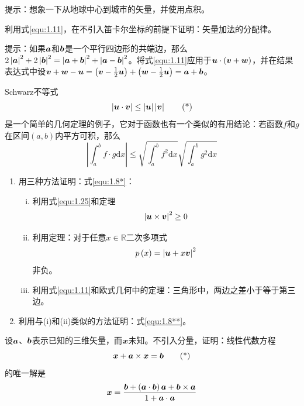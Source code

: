 \begin{exercise}
    提示：想象一下从地球中心到城市的矢量，并使用点积。
    \item 利用式\eqref{equ:1.11}，在不引入笛卡尔坐标的前提下证明：矢量加法的分配律。
    
    提示：如果$\boldsymbol{a}$和$\boldsymbol{b}$是一个平行四边形的共端边，那么$2\left| \boldsymbol{a} \right|^2+2\left| \boldsymbol{b} \right|^2=\left| \boldsymbol{a}+\boldsymbol{b} \right|^2+\left| \boldsymbol{a}-\boldsymbol{b} \right|^2$。将式\eqref{equ:1.11}应用于$\boldsymbol{u}\cdot \left( \boldsymbol{v}+\boldsymbol{w} \right) $，并在结果表达式中设$\boldsymbol{v}+\boldsymbol{w}-\boldsymbol{u}=\left( \boldsymbol{v}-\frac{1}{2}\boldsymbol{u} \right) +\left( \boldsymbol{w}-\frac{1}{2}\boldsymbol{u} \right) =\boldsymbol{a}+\boldsymbol{b}$。
    \item Schwarz不等式
    \begin{equation}\label{equ:1.8*}
        \left| \boldsymbol{u}\cdot \boldsymbol{v} \right|\le \left| \boldsymbol{u} \right|\left| \boldsymbol{v} \right|\tag{*}
    \end{equation}
    是一个简单的几何定理的例子，它对于函数也有一个类似的有用结论：若函数$f$和$g$在区间$(a,b)$内平方可积，那么
    \begin{equation}\label{equ:1.8**}
         \left| \int_a^b{f\cdot g\mathrm{d}x} \right|\le \sqrt{\int_a^b{f^2\mathrm{d}x}}\sqrt{\int_a^b{g^2\mathrm{d}x}}\tag{**}
    \end{equation}
    \begin{enumerate}
        \item 用三种方法证明：式\eqref{equ:1.8*}：
            \begin{enumerate}[(i)]
                \item 利用式\eqref{equ:1.25}和定理
                \begin{equation*}
                    \left| \boldsymbol{u}\times \boldsymbol{v} \right|^2\ge 0
                \end{equation*}
                \item 利用定理：对于任意$x\in \mathbb{R} $二次多项式
                \begin{equation*}
                    p\left( x \right) =\left| \boldsymbol{u}+x\boldsymbol{v} \right|^2
                \end{equation*}
                非负。
                \item 利用式\eqref{equ:1.11}和欧式几何中的定理：三角形中，两边之差小于等于第三边。
            \end{enumerate}
        \item 利用与(i)和(ii)类似的方法证明：式\eqref{equ:1.8**}。
    \end{enumerate}
    \item 设$\boldsymbol{a}$、$\boldsymbol{b}$表示已知的三维矢量，而$\boldsymbol{x}$未知。不引入分量，证明：线性代数方程
    \begin{equation}\label{equ:1.9 *}
        \boldsymbol{x}+\boldsymbol{a}\times \boldsymbol{x}=\boldsymbol{b}\tag{*}
    \end{equation}
    的唯一解是
    \begin{equation*}
        \boldsymbol{x}=\frac{\boldsymbol{b}+\left( \boldsymbol{a}\cdot \boldsymbol{b} \right) \boldsymbol{a}+\boldsymbol{b}\times \boldsymbol{a}}{1+\boldsymbol{a}\cdot \boldsymbol{a}}
    \end{equation*}


\end{exercise}
